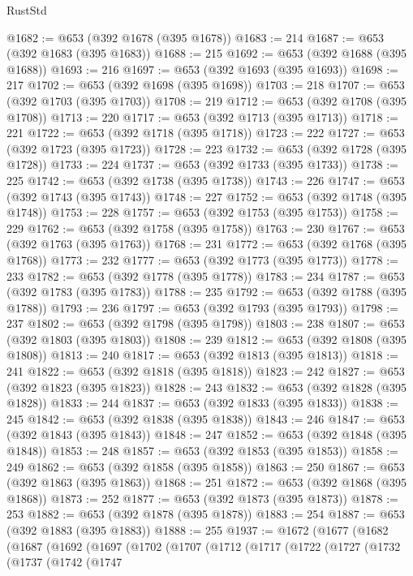 \begin{lexlean}{RustStd}
\begin{coremodule}
@1682 := @653 (@392 @1678 (@395 @1678))
@1683 := 214
@1687 := @653 (@392 @1683 (@395 @1683))
@1688 := 215
@1692 := @653 (@392 @1688 (@395 @1688))
@1693 := 216
@1697 := @653 (@392 @1693 (@395 @1693))
@1698 := 217
@1702 := @653 (@392 @1698 (@395 @1698))
@1703 := 218
@1707 := @653 (@392 @1703 (@395 @1703))
@1708 := 219
@1712 := @653 (@392 @1708 (@395 @1708))
@1713 := 220
@1717 := @653 (@392 @1713 (@395 @1713))
@1718 := 221
@1722 := @653 (@392 @1718 (@395 @1718))
@1723 := 222
@1727 := @653 (@392 @1723 (@395 @1723))
@1728 := 223
@1732 := @653 (@392 @1728 (@395 @1728))
@1733 := 224
@1737 := @653 (@392 @1733 (@395 @1733))
@1738 := 225
@1742 := @653 (@392 @1738 (@395 @1738))
@1743 := 226
@1747 := @653 (@392 @1743 (@395 @1743))
@1748 := 227
@1752 := @653 (@392 @1748 (@395 @1748))
@1753 := 228
@1757 := @653 (@392 @1753 (@395 @1753))
@1758 := 229
@1762 := @653 (@392 @1758 (@395 @1758))
@1763 := 230
@1767 := @653 (@392 @1763 (@395 @1763))
@1768 := 231
@1772 := @653 (@392 @1768 (@395 @1768))
@1773 := 232
@1777 := @653 (@392 @1773 (@395 @1773))
@1778 := 233
@1782 := @653 (@392 @1778 (@395 @1778))
@1783 := 234
@1787 := @653 (@392 @1783 (@395 @1783))
@1788 := 235
@1792 := @653 (@392 @1788 (@395 @1788))
@1793 := 236
@1797 := @653 (@392 @1793 (@395 @1793))
@1798 := 237
@1802 := @653 (@392 @1798 (@395 @1798))
@1803 := 238
@1807 := @653 (@392 @1803 (@395 @1803))
@1808 := 239
@1812 := @653 (@392 @1808 (@395 @1808))
@1813 := 240
@1817 := @653 (@392 @1813 (@395 @1813))
@1818 := 241
@1822 := @653 (@392 @1818 (@395 @1818))
@1823 := 242
@1827 := @653 (@392 @1823 (@395 @1823))
@1828 := 243
@1832 := @653 (@392 @1828 (@395 @1828))
@1833 := 244
@1837 := @653 (@392 @1833 (@395 @1833))
@1838 := 245
@1842 := @653 (@392 @1838 (@395 @1838))
@1843 := 246
@1847 := @653 (@392 @1843 (@395 @1843))
@1848 := 247
@1852 := @653 (@392 @1848 (@395 @1848))
@1853 := 248
@1857 := @653 (@392 @1853 (@395 @1853))
@1858 := 249
@1862 := @653 (@392 @1858 (@395 @1858))
@1863 := 250
@1867 := @653 (@392 @1863 (@395 @1863))
@1868 := 251
@1872 := @653 (@392 @1868 (@395 @1868))
@1873 := 252
@1877 := @653 (@392 @1873 (@395 @1873))
@1878 := 253
@1882 := @653 (@392 @1878 (@395 @1878))
@1883 := 254
@1887 := @653 (@392 @1883 (@395 @1883))
@1888 := 255
@1937 := @1672
    (@1677
      (@1682
        (@1687
          (@1692
            (@1697
              (@1702
                (@1707
                  (@1712
                    (@1717
                      (@1722
                        (@1727
                          (@1732
                            (@1737
                              (@1742
                                (@1747

\end{coremodule}
\end{lexlean}
